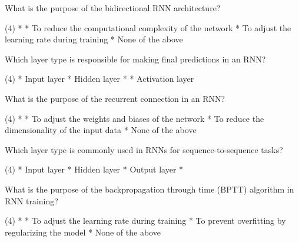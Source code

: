 \documentclass[10pt]{extarticle}
\begin{document}
\begin{exercise}
    What is the purpose of the bidirectional RNN architecture?
    \begin{choice} (4)
        * 
        * To reduce the computational complexity of the network
        * To adjust the learning rate during training
        * None of the above
    \end{choice}
\end{exercise}
\begin{solution}
\end{solution}

\begin{exercise}
    Which layer type is responsible for making final predictions in an RNN?
    \begin{choice} (4)
        * Input layer
        * Hidden layer
        * 
        * Activation layer
    \end{choice}
\end{exercise}
\begin{solution}
\end{solution}

\begin{exercise}
    What is the purpose of the recurrent connection in an RNN?
    \begin{choice} (4)
        * 
        * To adjust the weights and biases of the network
        * To reduce the dimensionality of the input data
        * None of the above
    \end{choice}
\end{exercise}
\begin{solution}
\end{solution}

\begin{exercise}
    Which layer type is commonly used in RNNs for sequence-to-sequence tasks?
    \begin{choice} (4)
        * Input layer
        * Hidden layer
        * Output layer
        * 
    \end{choice}
\end{exercise}
\begin{solution}
\end{solution}

\begin{exercise}
    What is the purpose of the backpropagation through time (BPTT) algorithm in RNN training?
    \begin{choice} (4)
        * 
        * To adjust the learning rate during training
        * To prevent overfitting by regularizing the model
        * None of the above
    \end{choice}
\end{exercise}
\begin{solution}
\end{solution}
\end{document}
